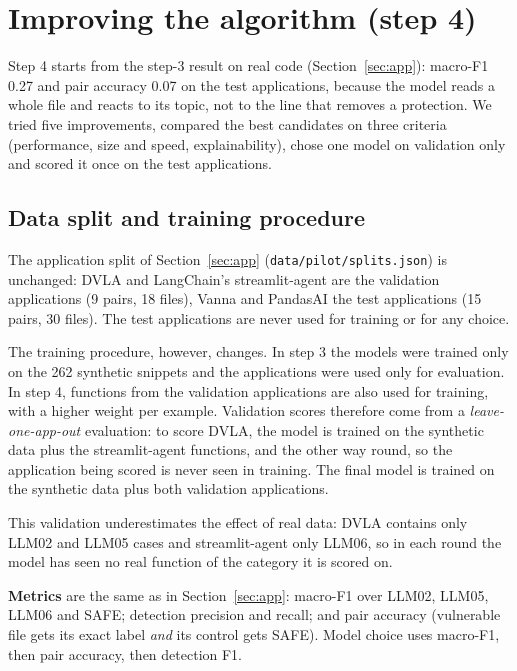 \documentclass[11pt,a4paper]{article}
\newcommand{\code}[1]{\texttt{#1}}
\begin{document}
\section{Improving the algorithm (step 4)}
\label{sec:improve}

Step 4 starts from the step-3 result on real code (Section~\ref{sec:app}): macro-F1 0.27
and pair accuracy 0.07 on the test applications, because the model reads a whole file and
reacts to its topic, not to the line that removes a protection. We tried five
improvements, compared the best candidates on three criteria (performance, size and
speed, explainability), chose one model on validation only and scored it once on the
test applications.

\subsection{Data split and training procedure}

The application split of Section~\ref{sec:app} (\code{data/pilot/splits.json}) is
unchanged: DVLA and LangChain's streamlit-agent are the validation applications
(9 pairs, 18 files), Vanna and PandasAI the test applications (15 pairs, 30 files).
The test applications are never used for training or for any choice.

The training procedure, however, changes. In step 3 the models were trained only on the
262 synthetic snippets and the applications were used only for evaluation. In step 4,
functions from the validation applications are also used for training, with a higher
weight per example. Validation scores therefore come from a
\emph{leave-one-app-out} evaluation: to score DVLA, the model is trained on the synthetic
data plus the streamlit-agent functions, and the other way round, so the application being
scored is never seen in training. The final model is trained on the synthetic data plus
both validation applications.

This validation underestimates the effect of real data: DVLA contains only LLM02 and
LLM05 cases and streamlit-agent only LLM06, so in each round the model has seen no real
function of the category it is scored on.

\textbf{Metrics} are the same as in Section~\ref{sec:app}: macro-F1 over LLM02, LLM05,
LLM06 and SAFE; detection precision and recall; and pair accuracy (vulnerable file gets
its exact label \emph{and} its control gets SAFE). Model choice uses macro-F1, then pair
accuracy, then detection F1.
\end{document}
